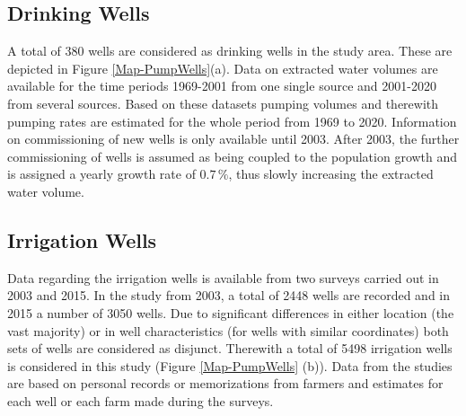 \subsection{Drinking Wells}


A total of 380 wells are considered as drinking wells in the study area. 
These are depicted in Figure \ref{Map-PumpWells}(a). 
Data on extracted water volumes are available for the time periods 1969-2001 from one single source and 2001-2020 from several sources. 
Based on these datasets pumping volumes and therewith pumping rates are estimated for the whole period from 1969 to 2020. 
Information on commissioning of new wells is only available until 2003. 
After 2003, the further commissioning of wells is assumed as being coupled to the population growth and is assigned a yearly growth rate of $0.7 \, \%$, thus slowly increasing the extracted water volume.


\subsection{Irrigation Wells}


Data regarding the irrigation wells is available from two surveys carried out in 2003 and 2015. 
In the study from 2003, a total of 2448 wells are recorded and in 2015 a number of 3050 wells. 
Due to significant differences in either location (the vast majority) or in well characteristics (for wells with similar coordinates) both sets of wells are considered as disjunct. 
Therewith a total of 5498 irrigation wells is considered in this study (Figure \ref{Map-PumpWells} (b)). 
Data from the studies are based on personal records or memorizations from farmers and estimates for each well or each farm made during the surveys.

